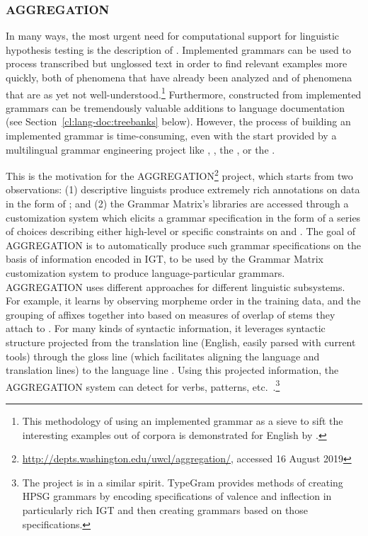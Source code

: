 \documentclass[output=paper,nonflat]{langsci/langscibook}
\begin{document}

\subsubsection{AGGREGATION}
\label{cl:lang-doc:aggr}


In many ways, the most urgent need for computational support for
linguistic hypothesis testing is the description of . Implemented grammars can be used to process transcribed but
unglossed text in order to find relevant examples more quickly, both
of phenomena that have already been analyzed and of phenomena that are
as yet not well-understood.\footnote{This methodology of using an
  implemented grammar as a sieve to sift the interesting examples out
  of corpora is demonstrated for English by \cite{Baldwin-et-al-05}.}
Furthermore,  constructed from implemented grammars can be
tremendously valuable additions to language documentation (see
Section~\ref{cl:lang-doc:treebanks} below). However, the process of building an
implemented grammar is time-consuming, even with the start provided by
a multilingual grammar engineering project like ,  \citep{BDKMR02a-u,Kin:For:Kuh:But:05}, the  \cite{Ranta:09}, or the
.

This is the motivation for the AGGREGATION\footnote{\url{http://depts.washington.edu/uwcl/aggregation/}, accessed 16 August 2019}
project, which starts from two observations: (1) descriptive linguists
produce extremely rich annotations on data in the form of ; and (2) the Grammar Matrix's libraries are
accessed through a customization system which elicits a grammar
specification in the form of a series of choices describing either
high-level  or specific constraints on  and .  The goal of AGGREGATION is to
automatically produce such grammar specifications on the basis of
information encoded in IGT, to be used by the Grammar Matrix
customization system to produce language-particular
grammars. AGGREGATION uses different approaches for different
linguistic subsystems. For example, it learns  by
observing morpheme order in the training data, and the grouping
of affixes together into  based on measures of overlap of
stems they attach to \citep{Wax:14,Zamaraeva:17}. For many kinds of
syntactic information, it leverages syntactic structure projected from
the translation line (English, easily parsed with current tools)
through the gloss line (which facilitates aligning the language and
translation lines) to the language line
\citep{Xia:Lew:07,Georgi:16}. Using this projected information, the
AGGREGATION system can detect  for verbs, 
patterns, etc.\ \citep{Ben:Goo:Cro:Xia:13,Zam:How:Ben:19}.\footnote{The  project \citep{Hel:Bee:14} is in a similar spirit. TypeGram provides methods of creating HPSG grammars by encoding specifications of valence and inflection in particularly rich IGT and then creating grammars based on those specifications.}
\end{document}
